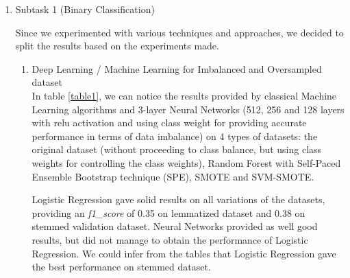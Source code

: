 \documentclass[11pt]{article}
\begin{document}
\begin{enumerate}

	\item Subtask 1 (Binary Classification)
	
        Since we experimented with various techniques and approaches, we decided to split the results based on the experiments made.
        
	      \begin{enumerate}
		      \item Deep Learning / Machine Learning for Imbalanced and Oversampled dataset
		      \\
		      In table \ref{table1}, we can notice the results provided by classical Machine Learning algorithms and 3-layer Neural Networks (512, 256 and 128 layers with relu activation and using class weight for providing accurate performance in terms of data imbalance) on 4 types of datasets: the original dataset (without proceeding to class balance, but using class weights for controlling the class weights), Random Forest with Self-Paced Ensemble Bootstrap technique (SPE), SMOTE and SVM-SMOTE.
		      
		      Logistic Regression gave solid results on all variations of the datasets, providing an \textit{f1\_score} of 0.35 on lemmatized dataset and 0.38 on stemmed validation dataset. Neural Networks provided as well good results, but did not manage to obtain the performance of Logistic Regression. We could infer from the tables that Logistic Regression gave the best performance on stemmed dataset.
		      

\end{enumerate}
\end{enumerate}
\end{document}

